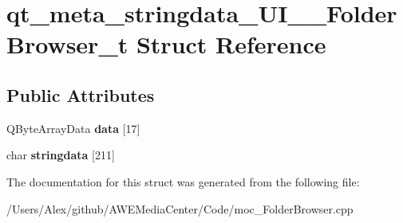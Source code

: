 \hypertarget{structqt__meta__stringdata___u_i_____folder_browser__t}{\section{qt\-\_\-meta\-\_\-stringdata\-\_\-\-U\-I\-\_\-\-\_\-\-Folder\-Browser\-\_\-t Struct Reference}
\label{structqt__meta__stringdata___u_i_____folder_browser__t}
}
\subsection*{Public Attributes}
\begin{DoxyCompactItemize}
\item 
\hypertarget{structqt__meta__stringdata___u_i_____folder_browser__t_afdbfbf8724d60f69499b636a99506ca6}{Q\-Byte\-Array\-Data {\bfseries data} \mbox{[}17\mbox{]}}\label{structqt__meta__stringdata___u_i_____folder_browser__t_afdbfbf8724d60f69499b636a99506ca6}

\item 
\hypertarget{structqt__meta__stringdata___u_i_____folder_browser__t_a2852da8360f33b0134cfd96a4ad00af0}{char {\bfseries stringdata} \mbox{[}211\mbox{]}}\label{structqt__meta__stringdata___u_i_____folder_browser__t_a2852da8360f33b0134cfd96a4ad00af0}

\end{DoxyCompactItemize}


The documentation for this struct was generated from the following file\-:\begin{DoxyCompactItemize}
\item 
/\-Users/\-Alex/github/\-A\-W\-E\-Media\-Center/\-Code/moc\-\_\-\-Folder\-Browser.\-cpp\end{DoxyCompactItemize}
